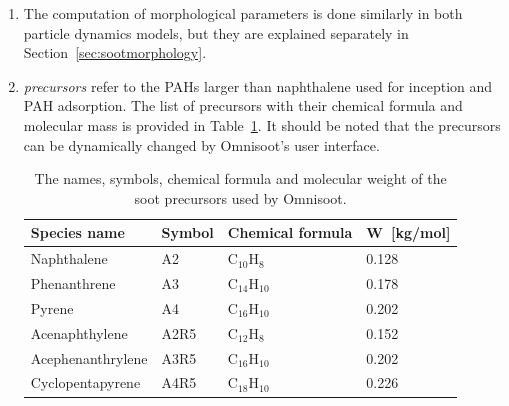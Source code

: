 \begin{enumerate}
	
	\item The computation of morphological parameters is done similarly in both particle dynamics models, but they are explained separately in Section~\ref{sec:sootmorphology}.
	
	\item \textit{precursors} refer to the PAHs larger than naphthalene used for inception and PAH adsorption. The list of precursors with their chemical formula and molecular mass is provided in Table~\ref{tab:precursors_list}. It should be noted that the precursors can be dynamically changed by Omnisoot's user interface.
	
	\renewcommand{\arraystretch}{1.5}
	\begin{table}
		\caption{The names, symbols, chemical formula and molecular weight of the soot precursors used by Omnisoot.}
		\label{tab:precursors_list}
		\centering
		\begin{tabular}{l l l l}
			\hline
			Species name & Symbol & Chemical formula & W~[kg/mol] \\
			\hline
			Naphthalene       & A2   &  $\mathrm{C_{10}H_{8}}$   & 0.128 \\
			Phenanthrene      & A3   &  $\mathrm{C_{14}H_{10}}$  & 0.178 \\
			Pyrene            & A4   &  $\mathrm{C_{16}H_{10}}$  & 0.202 \\
			Acenaphthylene    & A2R5 &  $\mathrm{C_{12}H_{8}}$   & 0.152 \\
			Acephenanthrylene & A3R5 &  $\mathrm{C_{16}H_{10}}$  & 0.202 \\
			Cyclopentapyrene  & A4R5 &  $\mathrm{C_{18}H_{10}}$  & 0.226 \\
			\hline
		\end{tabular}
	\end{table}
	
\end{enumerate}

